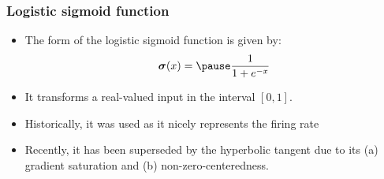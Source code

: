 \documentclass[smaller]{beamer}
\begin{document}
\begin{frame}
  \frametitle{Logistic sigmoid function}
  \begin{itemize}[<+->]
  \item The form of the logistic sigmoid function is given by:
    \begin{equation}
      \bm\sigma(x) = \pause \fr{1}{1 + e^{-x}}
    \end{equation}

  \item It transforms a real-valued input in the interval $[0,1]$.


      \begin{figure}[t!]
      
    \end{figure}

  \item Historically, it was used as it nicely represents the firing rate

  \item Recently, it has been superseded by the hyperbolic tangent due to its \pause (a) gradient saturation \pause and (b) \pause
    non-zero-centeredness.
    
  \end{itemize}
\end{frame}
\end{document}
